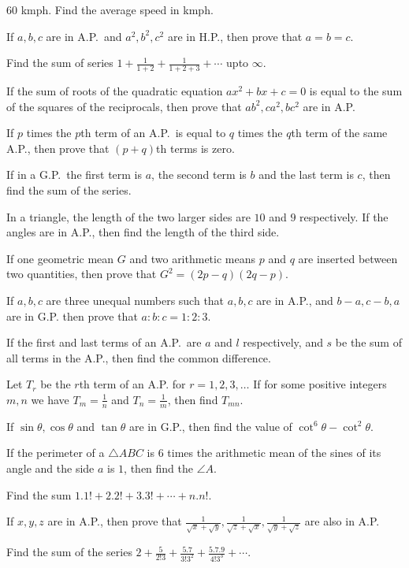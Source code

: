   $60$ kmph. Find the average speed in kmph.
\item If $a, b, c$ are in A.P.\ and $a^2, b^2, c^2$ are in H.P., then prove that $a = b = c$.
\item Find the sum of series $1 + \frac{1}{1 + 2} + \frac{1}{1 + 2 + 3} + \cdots$ upto $\infty$.
\item If the sum of roots of the quadratic equation $ax^2 + bx + c = 0$ is equal to the sum of the squares
  of the reciprocals, then prove that $ab^2, ca^2, bc^2$ are in A.P.
\item If $p$ times the $p$th term of an A.P.\ is equal to $q$ times the $q$th term of the same A.P., then
  prove that $(p + q)$th terms is zero.
\item If in a G.P.\ the first term is $a$, the second term is $b$ and the last term is $c$, then find the
  sum of the series.
\item In a triangle, the length of the two larger sides are $10$ and $9$ respectively. If the angles are in
  A.P., then find the length of the third side.
\item If one geometric mean $G$ and two arithmetic means $p$ and $q$ are inserted between two quantities,
  then prove that $G^2 = (2p - q)(2q - p)$.
\item If $a, b, c$ are three unequal numbers such that $a, b, c$ are in A.P., and $b - a, c - b, a$ are in
  G.P. then prove that $a:b:c = 1:2:3$.
\item If the first and last terms of an A.P.\ are $a$ and $l$ respectively, and $s$ be the sum of all terms
  in the A.P., then find the common difference.
\item Let $T_r$ be the $r$th term of an A.P. for $r = 1, 2, 3, \ldots$ If for some positive integers $m, n$
  we have $T_m = \frac{1}{n}$ and $T_n = \frac{1}{m}$, then find $T_{mn}$.
\item If $\sin\theta, \cos\theta$ and $\tan\theta$ are in G.P., then find the value of $\cot^6\theta
  - \cot^2\theta$.
\item If the perimeter of a $\triangle ABC$ is $6$ times the arithmetic mean of the sines of its angle and
  the side $a$ is $1$, then find the $\angle A$.
\item Find the sum $1.1! + 2.2! + 3.3! + \cdots + n.n!$.
\item If $x, y, z$ are in A.P., then prove that $\frac{1}{\sqrt{x} + \sqrt{y}}, \frac{1}{\sqrt{z}
  + \sqrt{x}}, \frac{1}{\sqrt{y} + \sqrt{z}}$ are also in A.P.
\item Find the sum of the series $2 + \frac{5}{2!3} + \frac{5.7}{3!3^2} + \frac{5.7.9}{4!3^3} + \cdots$.
